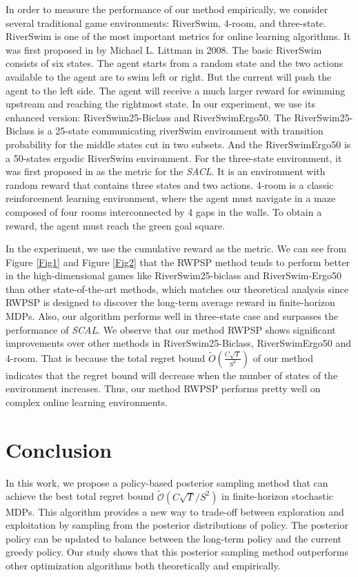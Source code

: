 \documentclass{article}
\theoremstyle{plain}
\theoremstyle{definition}
\theoremstyle{remark}
\begin{document}
In order to measure the performance of our method empirically, we consider several traditional game environments: RiverSwim, 4-room, and three-state. RiverSwim is one of the most important metrics for online learning algorithms. It was first proposed in \citet{article} by Michael L. Littman in 2008. The basic RiverSwim consists of six states. The agent starts from a random state and the two actions available to the agent are to swim left or right. But the current will push the agent to the left side. The agent will receive a much larger reward for swimming upstream and reaching the rightmost state. In our experiment, we use its enhanced version: RiverSwim25-Biclass and RiverSwimErgo50. The RiverSwim25-Biclass is a 25-state communicating riverSwim environment with transition probability for the middle states cut in two subsets. And the RiverSwimErgo50 is a 50-states ergodic RiverSwim environment. For the three-state environment, it was first proposed in \citet{fruit2018efficient} as the metric for the \emph{SACL}. It is an environment with random reward that contains three states and two actions. 4-room is a classic reinforcement learning environment, where the agent must navigate in a maze composed of four rooms interconnected by 4 gaps in the walls. To obtain a reward, the agent must reach the green goal square. 


In the experiment, we use the cumulative reward as the metric. We can see from Figure \ref{Fig1} and Figure \ref{Fig2} that the RWPSP method tends to perform better in the high-dimensional games like RiverSwim25-biclass and RiverSwim-Ergo50 than other state-of-the-art methods, which matches our theoretical analysis since RWPSP is designed to discover the long-term average reward in finite-horizon MDPs. Also, our algorithm performs well in three-state case and surpasses the performance of \emph{SCAL}. We observe that our method RWPSP shows significant improvements over other methods in RiverSwim25-Biclass, RiverSwimErgo50 and 4-room. That is because the total regret bound $\tilde{O}(\frac{C \sqrt{T}}{S^{2}})$ of our method indicates that the regret bound will decrease when the number of states of the environment increases. Thus, our method RWPSP performs pretty well on complex online learning environments. 

\section{Conclusion}
In this work, we propose a policy-based posterior sampling method that can achieve the best total regret bound $\tilde{\mathcal{O}}(C \sqrt{T}/S^{2})$ in finite-horizon stochastic MDPs. This algorithm provides a new way to trade-off between exploration and exploitation by sampling from the posterior distributions of policy. The posterior policy can be updated to balance between the long-term policy and the current greedy policy. Our study shows that this posterior sampling method outperforms other optimization algorithms both theoretically and empirically.
\end{document}
